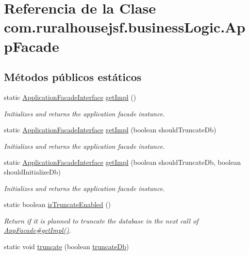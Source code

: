 \hypertarget{a00128}{}\section{Referencia de la Clase com.\+ruralhousejsf.\+business\+Logic.\+App\+Facade}
\label{a00128}
\subsection*{Métodos públicos estáticos}
\begin{DoxyCompactItemize}
\item 
static \mbox{\hyperlink{a00136}{Application\+Facade\+Interface}} \mbox{\hyperlink{a00128_a029bcceee98b9070b9f80abc54db45d6}{get\+Impl}} ()
\begin{DoxyCompactList}\small\item\em Initializes and returns the application facade instance. \end{DoxyCompactList}\item 
static \mbox{\hyperlink{a00136}{Application\+Facade\+Interface}} \mbox{\hyperlink{a00128_aa4bf7166aae19a2d640fd6ab8a0fff96}{get\+Impl}} (boolean should\+Truncate\+Db)
\begin{DoxyCompactList}\small\item\em Initializes and returns the application facade instance. \end{DoxyCompactList}\item 
static \mbox{\hyperlink{a00136}{Application\+Facade\+Interface}} \mbox{\hyperlink{a00128_aab339d9b44293704c9214aef70c7c704}{get\+Impl}} (boolean should\+Truncate\+Db, boolean should\+Initialize\+Db)
\begin{DoxyCompactList}\small\item\em Initializes and returns the application facade instance. \end{DoxyCompactList}\item 
static boolean \mbox{\hyperlink{a00128_a3638d881ea2d917df632a313d9ed9b20}{is\+Truncate\+Enabled}} ()
\begin{DoxyCompactList}\small\item\em Return if it is planned to truncate the database in the next call of \mbox{\hyperlink{a00128_a029bcceee98b9070b9f80abc54db45d6}{App\+Facade\#get\+Impl()}}. \end{DoxyCompactList}\item 
static void \mbox{\hyperlink{a00128_a98aed1ed8a03c6a92e15121fed4eb452}{truncate}} (boolean \mbox{\hyperlink{a00128_ac9cbe77035be5cc1f9bf258c57ca6564}{truncate\+Db}})

\end{DoxyCompactItemize}
